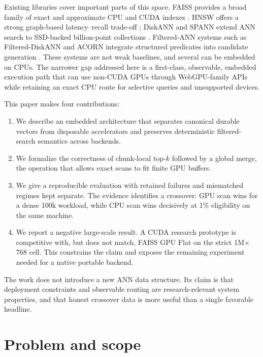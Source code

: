 \documentclass{article}
\begin{document}
Existing libraries cover important parts of this space. FAISS provides a broad family of exact
and approximate CPU and CUDA indexes \citep{johnson2019billion,douze2024faiss}. HNSW offers a
strong graph-based latency--recall trade-off \citep{malkov2020hnsw}; DiskANN and SPANN extend ANN
search to SSD-backed billion-point collections \citep{subramanya2019diskann,chen2021spann}.
Filtered-ANN systems such as Filtered-DiskANN and ACORN integrate structured predicates into
candidate generation \citep{gollapudi2023filtered,patel2024acorn}. These systems are not weak
baselines, and several can be embedded on CPUs. The narrower gap addressed here is a first-class,
observable, embedded execution path that can use non-CUDA GPUs through WebGPU-family APIs while
retaining an exact CPU route for selective queries and unsupported devices.

This paper makes four contributions:

\begin{enumerate}
  \item We describe an embedded architecture that separates canonical durable vectors from
  disposable accelerators and preserves deterministic filtered-search semantics across backends.
  \item We formalize the correctness of chunk-local top-$k$ followed by a global merge, the
  operation that allows exact scans to fit finite GPU buffers.
  \item We give a reproducible evaluation with retained failures and mismatched regimes kept
  separate. The evidence identifies a crossover: GPU scan wins for a dense 100k workload, while
  CPU scan wins decisively at 1\% eligibility on the same machine.
  \item We report a negative large-scale result. A CUDA research prototype is competitive with,
  but does not match, FAISS GPU Flat on the strict 1M$\times$768 cell. This constrains the claim
  and exposes the remaining experiment needed for a native portable backend.
\end{enumerate}

The work does not introduce a new ANN data structure. Its claim is that deployment constraints
and observable routing are research-relevant system properties, and that honest crossover data is
more useful than a single favorable headline.

\section{Problem and scope}
\end{document}

